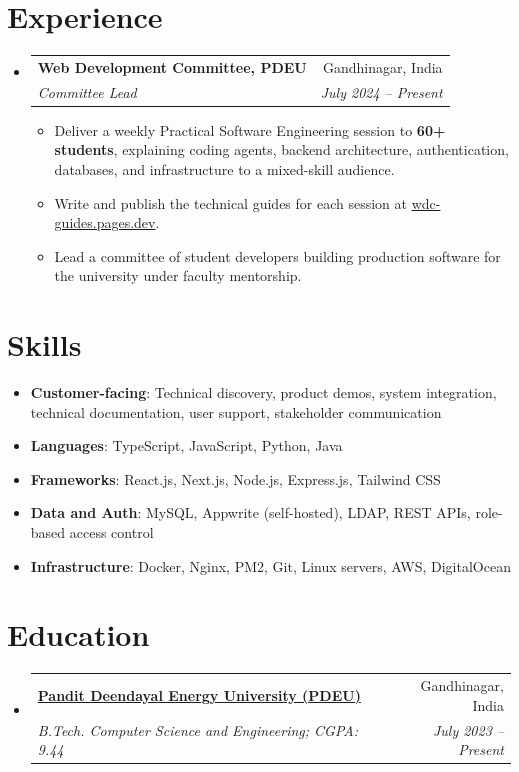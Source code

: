 \documentclass[a4paper,11pt]{article}
\makeatletter
\newcommand{\resumeItem}[2]{
  \item\small{\textbf{#1}{: #2 \vspace{-2pt}}}
}
\newcommand{\resumeSubheadingFull}[4]{
  \vspace{-1pt}\item
    \begin{tabular*}{0.97\textwidth}{l@{\extracolsep{\fill}}r}
    \textbf{#1} & #2 \\
    \textit{#3} & \textit{#4} \\
    \end{tabular*}\vspace{-5pt}
}
\newcommand{\resumeSubItem}[2]{\resumeItem{#1}{#2}\vspace{-3pt}}
\newcommand{\resumeSubHeadingListStart}{\begin{itemize}[leftmargin=*]}
\newcommand{\resumeSubHeadingListEnd}{\end{itemize}}
\newcommand{\resumeItemListStart}{\begin{itemize}[itemsep=1pt,topsep=3pt]\small}
\newcommand{\resumeItemListEnd}{\end{itemize}\vspace{-3pt}}
\makeatother
\begin{document}
\section{Experience}
  \resumeSubHeadingListStart
    \resumeSubheadingFull{Web Development Committee, PDEU}{Gandhinagar, India}
      {Committee Lead}{July 2024 -- Present}
      \resumeItemListStart
        \item Deliver a weekly Practical Software Engineering session to \textbf{60+ students}, explaining coding agents, backend architecture, authentication, databases, and infrastructure to a mixed-skill audience.
        \item Write and publish the technical guides for each session at \href{https://wdc-guides.pages.dev/guides/}{wdc-guides.pages.dev}.
        \item Lead a committee of student developers building production software for the university under faculty mentorship.
      \resumeItemListEnd
  \resumeSubHeadingListEnd

\section{Skills}
  \resumeSubHeadingListStart
    \resumeSubItem{Customer-facing}{Technical discovery, product demos, system integration, technical documentation, user support, stakeholder communication}
    \resumeSubItem{Languages}{TypeScript, JavaScript, Python, Java}
    \resumeSubItem{Frameworks}{React.js, Next.js, Node.js, Express.js, Tailwind CSS}
    \resumeSubItem{Data and Auth}{MySQL, Appwrite (self-hosted), LDAP, REST APIs, role-based access control}
    \resumeSubItem{Infrastructure}{Docker, Nginx, PM2, Git, Linux servers, AWS, DigitalOcean}
  \resumeSubHeadingListEnd

\section{Education}
  \resumeSubHeadingListStart
    \resumeSubheadingFull
      {\href{https://pdeu.ac.in/}{Pandit Deendayal Energy University (PDEU)}}{Gandhinagar, India}
      {B.Tech. Computer Science and Engineering; CGPA: 9.44}{July 2023 -- Present}
  \resumeSubHeadingListEnd
\end{document}
